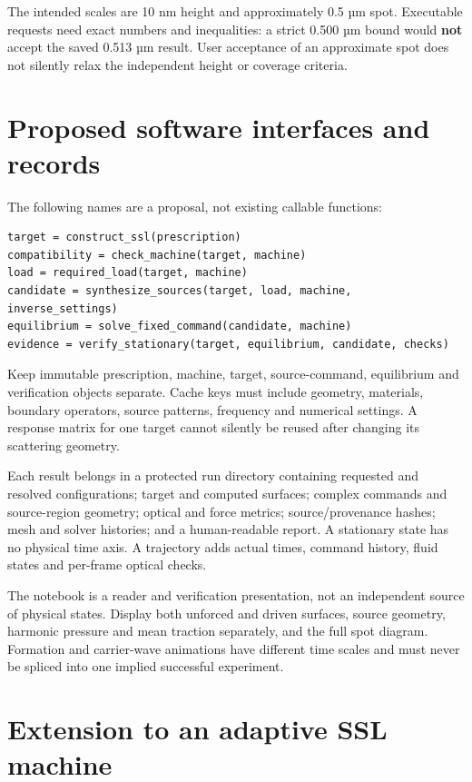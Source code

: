 The intended scales are 10 nm height and approximately 0.5 µm spot.
Executable requests need exact numbers and inequalities: a strict 0.500
µm bound would \textbf{not} accept the saved 0.513 µm result. User
acceptance of an approximate spot does not silently relax the
independent height or coverage criteria.

\section{Proposed software interfaces and records}\label{proposed-software-interfaces-and-records}

The following names are a proposal, not existing callable functions:

\begin{verbatim}
target = construct_ssl(prescription)
compatibility = check_machine(target, machine)
load = required_load(target, machine)
candidate = synthesize_sources(target, load, machine, inverse_settings)
equilibrium = solve_fixed_command(candidate, machine)
evidence = verify_stationary(target, equilibrium, candidate, checks)
\end{verbatim}

Keep immutable prescription, machine, target, source-command, equilibrium
and verification objects separate. Cache keys must include geometry, materials, boundary
operators, source patterns, frequency and numerical settings. A response
matrix for one target cannot silently be reused after changing its
scattering geometry.

Each result belongs in a protected run directory containing requested
and resolved configurations; target and computed surfaces; complex
commands and source-region geometry; optical and force metrics;
source/provenance hashes; mesh and solver histories; and a
human-readable report. A stationary state has no physical time axis. A
trajectory adds actual times, command history, fluid states and
per-frame optical checks.

The notebook is a reader and verification presentation, not an
independent source of physical states. Display both unforced and driven
surfaces, source geometry, harmonic pressure and mean traction
separately, and the full spot diagram. Formation and carrier-wave
animations have different time scales and must never be spliced into one
implied successful experiment.

\section{Extension to an adaptive SSL machine}\label{extension-to-an-adaptive-ssl-machine}


